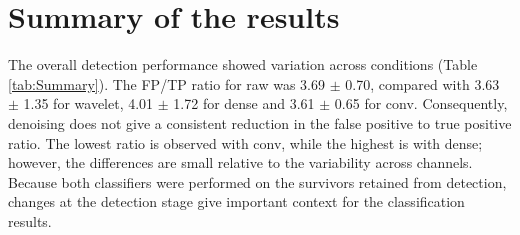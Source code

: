 \documentclass[ %
                    author={Rzan Alkabier},
                    supervisor={Dr. Zahraa Abdallah},
                    degree={MSc},
                     title={Denoising Extracellular Recording for Spike Detection and Classification on Single Channels},
                    subtitle={Does denoising improve detection and classification performance?},
                      type={},
                      year={2026}]{dissertation}
\begin{document}
\section{Summary of the results}
The overall detection performance showed variation across conditions (Table \ref{tab:Summary}). The FP/TP ratio for raw was 3.69 $\pm$ 0.70, compared with 3.63 $\pm$ 1.35 for wavelet, 4.01 $\pm$ 1.72 for dense and 3.61 $\pm$ 0.65 for conv. Consequently, denoising does not give a consistent reduction in the false positive to true positive ratio. The lowest ratio is observed with conv, while the highest is with dense; however, the differences are small relative to the variability across channels. 
Because both classifiers were performed on the survivors retained from detection, changes at the detection stage give important context for the classification results. 
\end{document}
